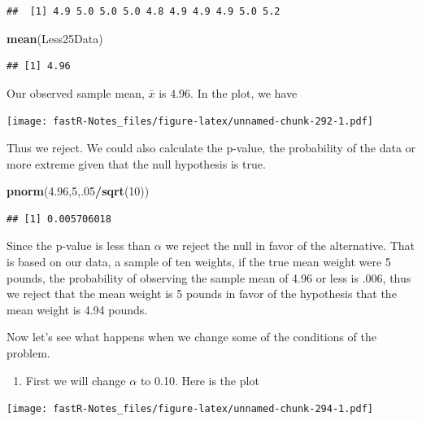 \documentclass[]{book}
\newenvironment{Shaded}{\begin{snugshade}}{\end{snugshade}}
\newcommand{\KeywordTok}[1]{\textcolor[rgb]{0.13,0.29,0.53}{\textbf{#1}}}
\newcommand{\DecValTok}[1]{\textcolor[rgb]{0.00,0.00,0.81}{#1}}
\newcommand{\FloatTok}[1]{\textcolor[rgb]{0.00,0.00,0.81}{#1}}
\newcommand{\OperatorTok}[1]{\textcolor[rgb]{0.81,0.36,0.00}{\textbf{#1}}}
\newcommand{\NormalTok}[1]{#1}
\providecommand{\tightlist}{%
  \setlength{\itemsep}{0pt}\setlength{\parskip}{0pt}}
\theoremstyle{definition}
\theoremstyle{definition}
\theoremstyle{definition}
\theoremstyle{remark}
\begin{document}
\begin{verbatim}
##  [1] 4.9 5.0 5.0 5.0 4.8 4.9 4.9 4.9 5.0 5.2
\end{verbatim}

\begin{Shaded}
\begin{Highlighting}[]
\KeywordTok{mean}\NormalTok{(Less25Data)}
\end{Highlighting}
\end{Shaded}

\begin{verbatim}
## [1] 4.96
\end{verbatim}

Our observed sample mean, \(\bar{x}\) is 4.96. In the plot, we have

\texttt{[image: fastR-Notes\_files/figure-latex/unnamed-chunk-292-1.pdf]}

Thus we reject. We could also calculate the p-value, the probability of
the data or more extreme given that the null hypothesis is true.

\begin{Shaded}
\begin{Highlighting}[]
\KeywordTok{pnorm}\NormalTok{(}\FloatTok{4.96}\NormalTok{,}\DecValTok{5}\NormalTok{,.}\DecValTok{05}\OperatorTok{/}\KeywordTok{sqrt}\NormalTok{(}\DecValTok{10}\NormalTok{))}
\end{Highlighting}
\end{Shaded}

\begin{verbatim}
## [1] 0.005706018
\end{verbatim}

Since the p-value is less than \(\alpha\) we reject the null in favor of
the alternative. That is based on our data, a sample of ten weights, if
the true mean weight were 5 pounds, the probability of observing the
sample mean of 4.96 or less is .006, thus we reject that the mean weight
is 5 pounds in favor of the hypothesis that the mean weight is 4.94
pounds.

Now let's see what happens when we change some of the conditions of the
problem.

\begin{enumerate}
\def\labelenumi{\arabic{enumi}.}
\tightlist
\item
  First we will change \(\alpha\) to 0.10. Here is the plot
\end{enumerate}

\texttt{[image: fastR-Notes\_files/figure-latex/unnamed-chunk-294-1.pdf]}
\end{document}
